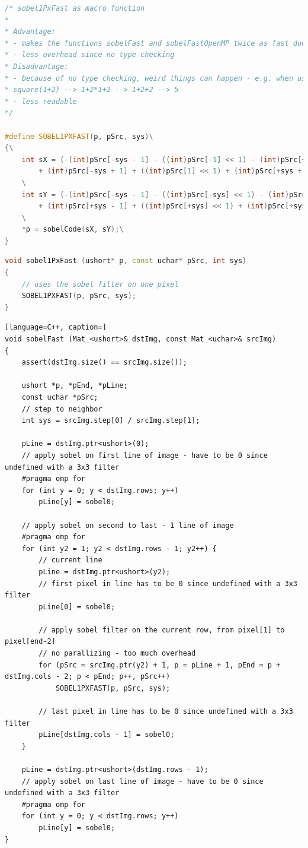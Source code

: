 \documentclass{ezb}
\begin{document}
\begin{lstlisting}[language=C++, caption=sobel1PxFast as macro function]
/* sobel1PxFast as macro function
* 
* Advantage:
* - makes the functions sobelFast and sobelFastOpenMP twice as fast due to forced inlining
* - less overhead since no type checking
* Disadvantage:
* - because of no type checking, weird things can happen - e.g. when used with expressions such as (1+2): #define square(a) a*a
* square(1+2) --> 1+2*1+2 --> 1+2+2 --> 5 
* - less readable
*/

#define SOBEL1PXFAST(p, pSrc, sys)\
{\
	int sX = (-(int)pSrc[-sys - 1] - ((int)pSrc[-1] << 1) - (int)pSrc[+sys - 1]\
		+ (int)pSrc[-sys + 1] + ((int)pSrc[1] << 1) + (int)pSrc[+sys + 1] + 3) >> 3;\
	\
	int sY = (-(int)pSrc[-sys - 1] - ((int)pSrc[-sys] << 1) - (int)pSrc[-sys + 1]\
		+ (int)pSrc[+sys - 1] + ((int)pSrc[+sys] << 1) + (int)pSrc[+sys + 1] + 3) >> 3;\
	\
	*p = sobelCode(sX, sY);\
}
\end{lstlisting}

\begin{lstlisting}[language=C++, caption=Core routine for \textbackslash c sobelFast]
void sobel1PxFast (ushort* p, const uchar* pSrc, int sys)
{
	// uses the sobel filter on one pixel
	SOBEL1PXFAST(p, pSrc, sys);
}
\end{lstlisting}

\begin{lstlisting}[language=C++, caption=]
void sobelFast (Mat_<ushort>& dstImg, const Mat_<uchar>& srcImg)
{
	assert(dstImg.size() == srcImg.size()); 

	ushort *p, *pEnd, *pLine; 
	const uchar *pSrc; 
	// step to neighbor
	int sys = srcImg.step[0] / srcImg.step[1];

	pLine = dstImg.ptr<ushort>(0);
	// apply sobel on first line of image - have to be 0 since undefined with a 3x3 filter
	#pragma omp for
	for (int y = 0; y < dstImg.rows; y++)
		pLine[y] = sobel0;

	// apply sobel on second to last - 1 line of image
	#pragma omp for
	for (int y2 = 1; y2 < dstImg.rows - 1; y2++) {
		// current line
		pLine = dstImg.ptr<ushort>(y2);
		// first pixel in line has to be 0 since undefined with a 3x3 filter
		pLine[0] = sobel0;

		// apply sobel filter on the current row, from pixel[1] to pixel[end-2]
		// no parallizing - too much overhead
		for (pSrc = srcImg.ptr(y2) + 1, p = pLine + 1, pEnd = p + dstImg.cols - 2; p < pEnd; p++, pSrc++)
			SOBEL1PXFAST(p, pSrc, sys);

		// last pixel in line has to be 0 since undefined with a 3x3 filter
		pLine[dstImg.cols - 1] = sobel0;
	}

	pLine = dstImg.ptr<ushort>(dstImg.rows - 1);
	// apply sobel on last line of image - have to be 0 since undefined with a 3x3 filter
	#pragma omp for
	for (int y = 0; y < dstImg.rows; y++)
		pLine[y] = sobel0;
}
\end{lstlisting}
\end{document}
